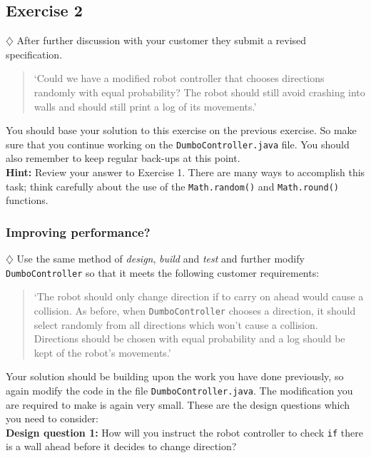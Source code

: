 \subsection{Exercise 2}

$\diamondsuit$
After further discussion with your customer they submit a revised specification.

\begin{quote}
`Could we have a modified robot controller that chooses directions randomly with equal
probability? The robot should still avoid crashing into walls and should still print a
log of its movements.'
\end{quote}

\noindent
You should base your solution to this exercise on the previous exercise. So make sure
that you continue working on the {\tt DumboController.java} file. You should also remember
to keep regular back-ups at this point.\\

\noindent
{\bf Hint:}
Review your answer to Exercise 1. There are many ways to accomplish this task; think
carefully about the use of the {\tt Math.random()} and {\tt Math.round()} functions.

\subsubsection{Improving performance?}

$\diamondsuit$ 
Use the same method of {\em design}, {\em build} and {\em test} and further 
modify {\tt DumboController} so that it
meets the following customer requirements: 

\begin{quote}
`The robot should only change direction if to carry on ahead would cause 
a collision. As before, when {\tt DumboController} chooses a
direction, it should select randomly from all directions which won't
cause a collision. Directions should be chosen with equal probability and a 
log should be kept of the robot's movements.'
\end{quote}

\noindent
Your solution should be building upon the work you have done previously, so 
again modify the code in the file {\tt DumboController.java}.
The modification you are required to make is again very small. These are the 
design questions which you need to consider: \\

\noindent
{\bf Design question 1:}
How will you instruct the robot  
controller to check {\tt if} there is a wall ahead before it decides to 
change direction?\\

